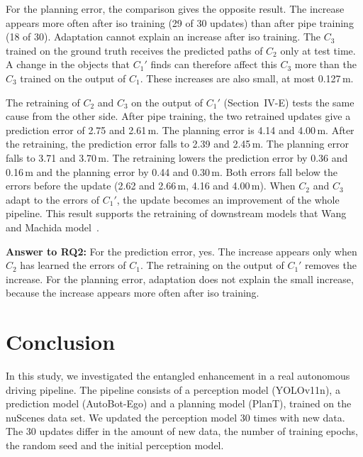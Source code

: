 \documentclass[conference]{IEEEtran}
\begin{document}
For the planning error, the comparison gives the opposite result. The increase appears more often after iso training (29 of 30 updates) than after pipe training (18 of 30). Adaptation cannot explain an increase after iso training. The $C_3$ trained on the ground truth receives the predicted paths of $C_2$ only at test time. A change in the objects that $C_1'$ finds can therefore affect this $C_3$ more than the $C_3$ trained on the output of $C_1$. These increases are also small, at most 0.127\,m.

The retraining of $C_2$ and $C_3$ on the output of $C_1'$ (Section~IV-E) tests the same cause from the other side. After pipe training, the two retrained updates give a prediction error of 2.75 and 2.61\,m. The planning error is 4.14 and 4.00\,m. After the retraining, the prediction error falls to 2.39 and 2.45\,m. The planning error falls to 3.71 and 3.70\,m. The retraining lowers the prediction error by 0.36 and 0.16\,m and the planning error by 0.44 and 0.30\,m. Both errors fall below the errors before the update (2.62 and 2.66\,m, 4.16 and 4.00\,m). When $C_2$ and $C_3$ adapt to the errors of $C_1'$, the update becomes an improvement of the whole pipeline. This result supports the retraining of downstream models that Wang and Machida model~\cite{wang2024compsac,wang2025issre}.

\noindent\textbf{Answer to RQ2:} For the prediction error, yes. The increase appears only when $C_2$ has learned the errors of $C_1$. The retraining on the output of $C_1'$ removes the increase. For the planning error, adaptation does not explain the small increase, because the increase appears more often after iso training.

\section{Conclusion}

In this study, we investigated the entangled enhancement in a real autonomous driving pipeline. The pipeline consists of a perception model (YOLOv11n), a prediction model (AutoBot-Ego) and a planning model (PlanT), trained on the nuScenes data set. We updated the perception model 30 times with new data. The 30 updates differ in the amount of new data, the number of training epochs, the random seed and the initial perception model.
\end{document}
